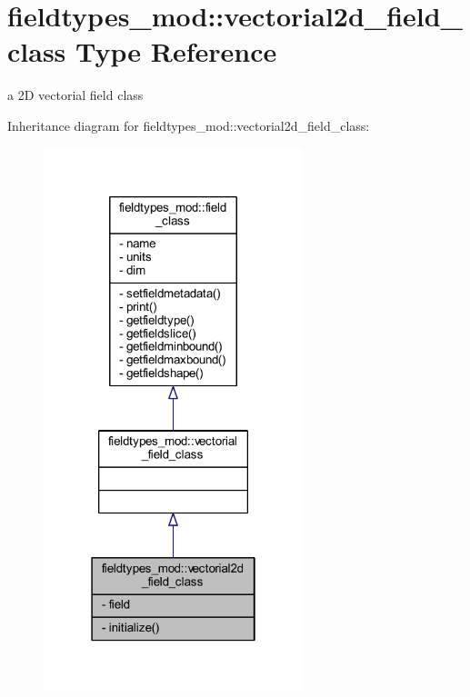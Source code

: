 \hypertarget{structfieldtypes__mod_1_1vectorial2d__field__class}{}\section{fieldtypes\+\_\+mod\+:\+:vectorial2d\+\_\+field\+\_\+class Type Reference}
\label{structfieldtypes__mod_1_1vectorial2d__field__class}


a 2D vectorial field class  




Inheritance diagram for fieldtypes\+\_\+mod\+:\+:vectorial2d\+\_\+field\+\_\+class\+:\nopagebreak
\begin{figure}[H]
\begin{center}
\leavevmode
\includegraphics[width=214pt]{structfieldtypes__mod_1_1vectorial2d__field__class__inherit__graph}
\end{center}
\end{figure}


